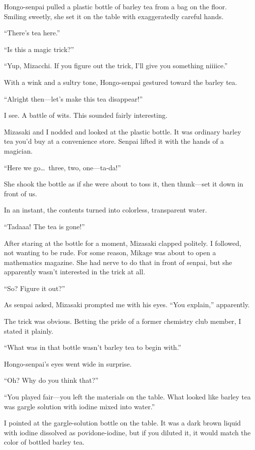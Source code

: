\documentclass[
    a4paper,
    12pt,
    twoside,
    openany,
    UTF8,
    fontset=windows
]{ctexbook}
\begin{document}
Hongo-senpai pulled a plastic bottle of barley tea from a bag on the floor. Smiling sweetly, she set it on the table with exaggeratedly careful hands.

``There's tea here.''

``Is this a magic trick?''

``Yup, Mizacchi. If you figure out the trick, I'll give you something niiiice.''

With a wink and a sultry tone, Hongo-senpai gestured toward the barley tea.

``Alright then---let's make this tea disappear!''

I see. A battle of wits. This sounded fairly interesting.

Mizasaki and I nodded and looked at the plastic bottle. It was ordinary barley tea you'd buy at a convenience store. Senpai lifted it with the hands of a magician.

``Here we go\dots\ three, two, one---ta-da!''

She shook the bottle as if she were about to toss it, then thunk---set it down in front of us.

In an instant, the contents turned into colorless, transparent water.

``Tadaaa! The tea is gone!''

After staring at the bottle for a moment, Mizasaki clapped politely. I followed, not wanting to be rude. For some reason, Mikage was about to open a mathematics magazine. She had nerve to do that in front of senpai, but she apparently wasn't interested in the trick at all.

``So? Figure it out?''

As senpai asked, Mizasaki prompted me with his eyes. ``You explain,'' apparently.

The trick was obvious. Betting the pride of a former chemistry club member, I stated it plainly.

``What was in that bottle wasn't barley tea to begin with.''

Hongo-senpai's eyes went wide in surprise.

``Oh? Why do you think that?''

``You played fair---you left the materials on the table. What looked like barley tea was gargle solution with iodine mixed into water.''

I pointed at the gargle-solution bottle on the table. It was a dark brown liquid with iodine dissolved as povidone-iodine, but if you diluted it, it would match the color of bottled barley tea.
\end{document}
